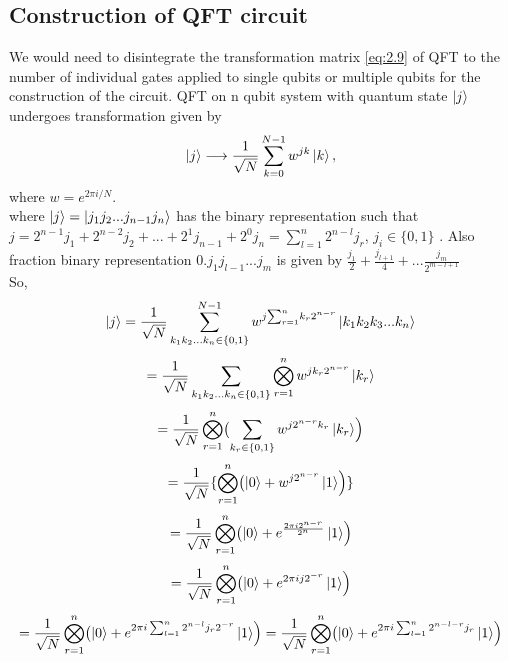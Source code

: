 \subsection{Construction of QFT circuit}
We would need to disintegrate the transformation matrix \eqref{eq:2.9} of QFT to the number of individual gates applied to single qubits or multiple qubits for the construction of the circuit.
QFT on  n qubit system with quantum state $\ket{j}$ undergoes transformation  given by \begin{equation}\raggedleft
     \ket{j} \longrightarrow \frac{1}{\sqrt{N}} \sum_{k=0}^{N-1} w^{jk} \ket{k},
\end{equation}where $w = e^{2\pi i/N}$.\\
where $\ket{j} = \ket{j_{1}j_{2} . . . j_{n-1}j_{n}}$ has the binary representation such that $j = 2^{n-1}j_{1} + 2^{n-2}j_{2} + ... + 2^{1}j_{n-1} + 2^{0}j_{n} = \sum_{l=1}^{n} 2^{n-l} j_r$,  $j_{i}\in \{0,1\}$ . Also fraction binary representation $0.j_1j_{l-1} . . . j_{m}$ is given by $ \frac{j_1}{2} + \frac{j_{l+1}}{4} + . . . \frac{j_{m}}{2^{m-l+1}}$\\
So,  \begin{equation}\raggedleft
     \ket{j} = \frac{1}{\sqrt{N}} \sum_{k_1k_2 . . . k_n \in \{0,1\}}^{N-1} w^{j{\sum_{r=1}^n} k_r 2^{n-r}} \ket{k_1k_2k_3 . . . k_n}
\end{equation}
\begin{equation}\raggedleft
      = \frac{1}{\sqrt{N}} \sum_{k_1k_2 . . . k_n \in \{0,1\}}
     \bigotimes_{r=1}^n w^{j k_r 2^{n-r}} \ket{k_r}
\end{equation}
\begin{equation}\raggedleft
      = \frac{1}{\sqrt{N}} \bigotimes_{r=1}^{n} \bigl( \sum_{k_r \in \{0,1\}} w^{j 2^{n-r} k_r} \ket{k_r}\Bigr)
\end{equation}
\begin{equation}\raggedleft
      = \frac{1}{\sqrt{N}} \{\bigotimes_{r=1}^n \bigl( \ket{0} + w^{j 2^{n-r} } \ket{1}\Bigr)\}
\end{equation}
\begin{equation}\raggedleft
      = \frac{1}{\sqrt{N}} \bigotimes_{r=1}^{n} \bigl( \ket{0} + e^\frac{2\pi i 2^{n-r}}{2^n}  \ket{1}\Bigr)
\end{equation}
\begin{equation}\raggedleft
      = \frac{1}{\sqrt{N}} \bigotimes_{r=1}^{n} \bigl( \ket{0} + e^{2\pi i j  2^{-r} } \ket{1}\Bigr)
\end{equation}
\begin{equation}\raggedleft
      = \frac{1}{\sqrt{N}} \bigotimes_{r=1}^{n} \bigl( \ket{0} + e^{2\pi i \sum_{l=1}^{n} 2^{n-l} j_r  2^{-r} } \ket{1}\Bigr) = \frac{1}{\sqrt{N}} \bigotimes_{r=1}^{n} \bigl( \ket{0} + e^{2\pi i \sum_{l=1}^{n} 2^{n-l-r} j_r} \ket{1}\Bigr)
\end{equation}\\
